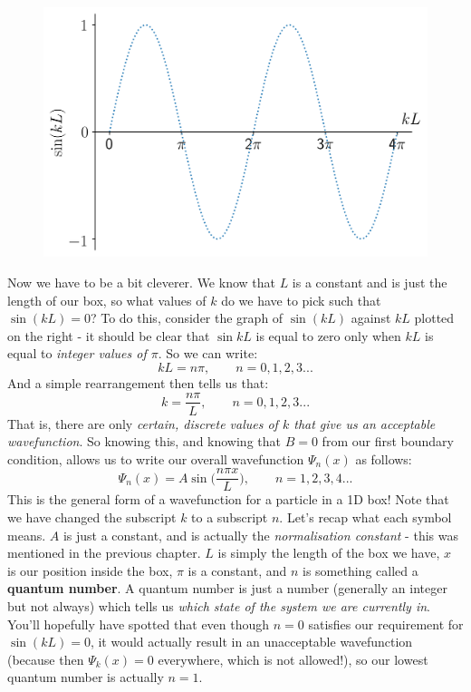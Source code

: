 \documentclass{memoir}[11pt,oneside,a4paper,openany]
\newcommand{\wf}{\ensuremath{\Psi}\xspace}
\begin{document}
\begin{figure}
	\includegraphics[width=\linewidth]{boundary_conditions_pinbox.png}
\end{figure}
Now we have to be a bit cleverer. We know that $L$ is a constant and is just the length of our box, so what values of $k$ do we have to pick such that $\sin(kL)=0$? To do this, consider the graph of $\sin(kL)$ against $kL$ plotted on the right - it should be clear that $\sin{kL}$ is equal to zero only when $kL$ is equal to \emph{integer values of $\pi$}. So we can write:
\begin{equation*}
	kL = n\pi, \qquad  n=0,1,2,3...
\end{equation*}
And a simple rearrangement then tells us that:
\begin{equation*}
	k = \frac{n\pi}{L}, \qquad n=0,1,2,3...
\end{equation*}
That is, there are only \emph{certain, discrete values of $k$ that give us an acceptable wavefunction}. So knowing this, and knowing that $B=0$ from our first boundary condition, allows us to write our overall wavefunction $\wf_n(x)$ as follows:
\begin{equation}
	\wf_n(x) = A\sin\bigg(\frac{n\pi x}{L}\bigg), \qquad n = 1,2,3,4...
\end{equation}
This is the general form of a wavefunction for a particle in a 1D box! Note that we have changed the subscript $k$ to a subscript $n$. Let's recap what each symbol means. $A$ is just a constant, and is actually the \emph{normalisation constant} - this was mentioned in the previous chapter. $L$ is simply the length of the box we have, $x$ is our position inside the box, $\pi$ is a constant, and $n$ is something called a \textbf{quantum number}. A quantum number is just a number (generally an integer but not always) which tells us \emph{which state of the system we are currently in}. You'll hopefully have spotted that even though $n=0$ satisfies our requirement for $\sin(kL) = 0$, it would actually result in an unacceptable wavefunction (because then $\wf_k(x) = 0$ everywhere, which is not allowed!), so our lowest quantum number is actually $n=1$. 
\end{document}
